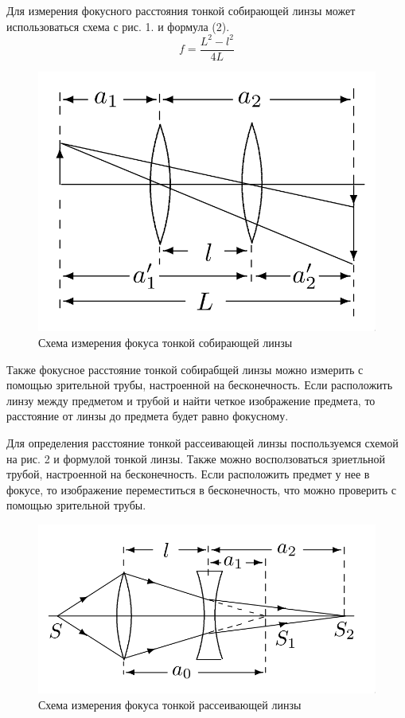 \documentclass{article}
\begin{document}
\noindent
Для измерения фокусного расстояния тонкой собирающей линзы может использоваться схема с рис. 1. и формула (2).
\begin{equation}
    f = \frac{L^2 - l^2}{4L}
\end{equation}

\begin{figure}[h]
    \centering
    \includegraphics[scale=0.3]{pic_1.png}
    \caption{Схема измерения фокуса тонкой собирающей линзы}
\end{figure}

\noindent
Также фокусное расстояние тонкой собирабщей линзы можно измерить с помощью зрительной трубы, настроенной на бесконечность. Если расположить линзу между предметом и трубой и найти четкое изображение предмета, то расстояние от линзы до предмета будет равно фокусному.

\noindent
Для определения расстояние тонкой рассеивающей линзы поспользуемся схемой на рис. 2 и формулой тонкой линзы. Также можно восползоваться зриетльной трубой, настроенной на бесконечность. Если расположить предмет у нее в фокусе, то изображение переместиться в бесконечность, что можно проверить с помощью зрительной трубы.

\begin{figure}[h]
    \centering
    \includegraphics[scale=0.35]{pic_2.png}
    \caption{Схема измерения фокуса тонкой рассеивающей линзы}
\end{figure}
\end{document}

